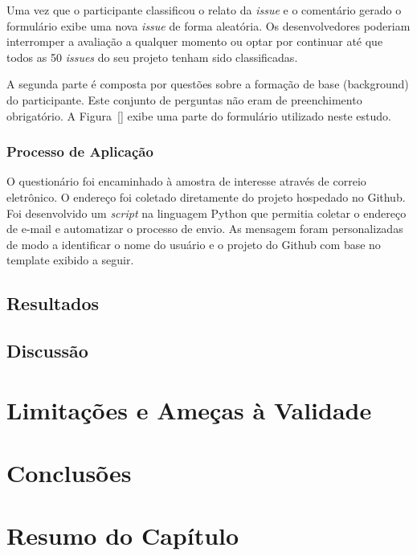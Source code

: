 Uma vez que o participante classificou o relato da \textit{issue} e o comentário
gerado o formulário exibe uma nova \textit{issue} de forma aleatória. Os
desenvolvedores poderiam interromper a avaliação a qualquer momento ou optar por
continuar até que todos as 50 \textit{issues} do seu projeto tenham sido
classificadas.

A segunda parte é composta por questões sobre a formação de base (background) do
participante. Este conjunto de perguntas não eram de preenchimento obrigatório.
A Figura~\ref{} exibe uma parte do formulário utilizado neste estudo.


\subsubsection{Processo de Aplicação}
\label{ssub:processo_de_aplicação}

O questionário foi encaminhado à amostra de interesse através de correio
eletrônico. O endereço foi coletado diretamente do projeto hospedado no Github.
Foi desenvolvido um \textit{script} na linguagem Python que permitia coletar o
endereço de e-mail e automatizar o processo de envio. As mensagem foram
personalizadas de modo a identificar o nome do usuário e o projeto do Github com
base no template exibido a seguir.


\subsection{Resultados}
\label{sub:implementacao_extensao_avaliacao_resultados}

\subsection{Discussão}
\label{sub:implemtacao_extensao_avaliacao_discussao}

\section{Limitações e Ameças à Validade}
\label{sec:limitações_e_ameças_à_validade}

\section{Conclusões}
\label{sec:conclusões}

\section{Resumo do Capítulo}
\label{sec:implemtacao_extensao_resumo}
